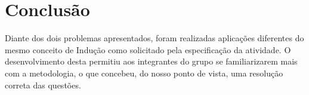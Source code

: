 \documentclass[a4paper, 10pt]{article}
\begin{document}

\section{Conclusão}

Diante dos dois problemas apresentados, foram realizadas aplicações diferentes do mesmo conceito de Indução como solicitado pela especificação da atividade. O desenvolvimento desta permitiu aos integrantes do grupo se familiarizarem mais com a metodologia, o que concebeu, do nosso ponto de vista, uma resolução correta das questões.
\end{document}
